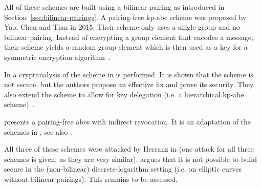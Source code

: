 All of these schemes are built using a bilinear pairing as introduced in Section~\ref{sec:bilinear-pairings}.
A pairing-free \acrshort{kp-abe} scheme was proposed by Yao, Chen and Tian \cite{yao_lightweight_2015} in 2015.
Their scheme only uses a single group and no bilinear pairing.
Instead of encrypting a group element that encodes a message, their scheme yields a random group element which is then used as a key for a symmetric encryption algorithm~\cite{yao_lightweight_2015}.

In \cite{tan_enhancement_2019} a cryptanalysis of the scheme in \cite{yao_lightweight_2015} is performed.
It is shown that the scheme is not secure, but the authors propose an effective fix and prove its security.
They also extend the scheme to allow for key delegation (i.e. a hierarchical \acrshort{kp-abe} scheme)~\cite{tan_enhancement_2019}.

\cite{sowjanya_efficient_2020} presents a pairing-free \acrshort{abes} with indirect revocation.
It is an adaptation of the schemes in \cite{yao_lightweight_2015,tan_enhancement_2019}, see also \cite{herranz_attacking_2020}.

All three of these schemes were attacked by Herranz in \cite{herranz_attacking_2020} (one attack for all three schemes is given, as they are very similar).
\cite{herranz_attacking_2020} argues that it is not possible to build secure  in the (non-bilinear) discrete-logarithm setting (i.e. on elliptic curves without bilinear pairings).
This remains to be assessed.